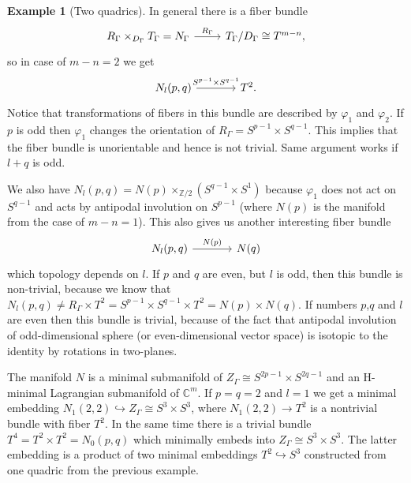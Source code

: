 \documentclass[jsg]{IP_v1_forauthors}
\theoremstyle{definition}
\numberwithin{equation}{section}
\newtheorem{exam}{Example}
\begin{document}
\begin{exam}[Two quadrics]
In general there is a fiber bundle
\begin{equation}
\begin{tikzcd}
R_\Gamma \times_{D_\Gamma} T_\Gamma = N_\Gamma \arrow[rightarrow]{r}{R_\Gamma}
  & T_\Gamma/D_\Gamma \cong T^{m-n},
\end{tikzcd}
\end{equation}
so in case of $m-n=2$ we get
\begin{equation}
\begin{tikzcd}[column sep=large]
N_l(p,q) \arrow[rightarrow]{r}{S^{p-1} \times S^{q-1}}
  & T^{2}.
\end{tikzcd}
\end{equation}
Notice that transformations of fibers in this bundle are described by $\varphi_1$ and $\varphi_2$. If $p$ is odd then $\varphi_1$ changes the orientation of $R_\Gamma = S^{p-1} \times S^{q-1}$. This implies that the fiber bundle is unorientable and hence is not trivial. Same argument works if $l+q$ is odd.

We also have $N_l (p,q) =N(p)\times_{{\mathbb Z}/2} (S^{q-1} \times S^1) $ because $\varphi_1$ does not act on $S^{q-1}$ and acts by antipodal involution on $S^{p-1}$
(where $N(p)$ is the manifold from the case of $m-n=1$). This also gives us another interesting fiber bundle
\begin{equation}
\begin{tikzcd}[column sep=large]
N_l(p,q) \arrow[rightarrow]{r}{N(p)}
  & N(q)
\end{tikzcd}
\end{equation}
which topology depends on $l$. If $p$ and $q$ are even, but $l$ is odd, then this bundle is non-trivial, because we know that $N_l(p,q) \neq R_\Gamma \times T^2 = S^{p-1} \times S^{q-1} \times T^2 = N(p) \times N(q)$. If numbers $p$,$q$ and $l$ are even then this bundle is trivial, because of the fact that antipodal involution of odd-dimensional sphere (or even-dimensional vector space) is isotopic to the identity by rotations in two-planes.

The manifold $N$ is a minimal submanifold of $Z_\Gamma \cong S^{2p-1} \times S^{2q-1}$ and an H-minimal Lagrangian submanifold of ${\mathbb C}^m$. If $p=q=2$ and $l=1$ we get a minimal embedding $N_1(2,2)\hookrightarrow Z_\Gamma \cong S^{3} \times S^{3}$, where $N_1(2,2)\rightarrow T^2$ is a nontrivial bundle with fiber $T^2$. In the same time there is a trivial bundle $T^4=T^2\times T^2=N_0(p,q)$ which minimally embeds into $Z_\Gamma \cong S^{3} \times S^{3}$. The latter embedding is a product of two minimal embeddings $T^2 \hookrightarrow S^3$ constructed from one quadric from the previous example.
\end{exam}
\end{document}

